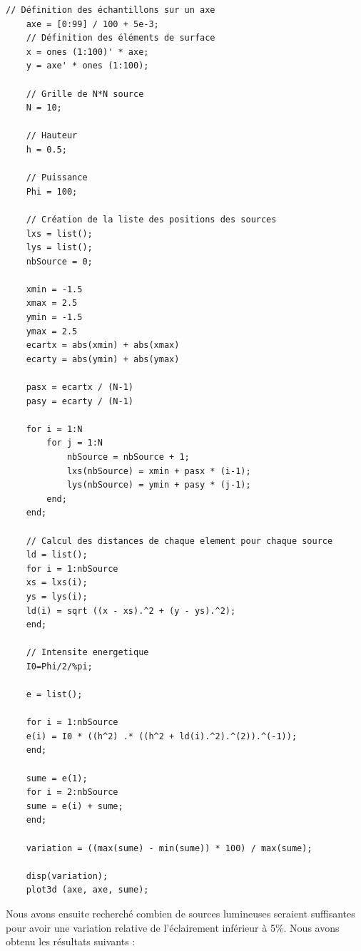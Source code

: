 \documentclass[a4paper,11pt]{article}
\begin{document}
  \begin{lstlisting}[caption=Code pour l'eclairement d'une grille de sources ponctuelles]
    // Définition des échantillons sur un axe
    axe = [0:99] / 100 + 5e-3; 
    // Définition des éléments de surface
    x = ones (1:100)' * axe;
    y = axe' * ones (1:100);

    // Grille de N*N source
    N = 10;

    // Hauteur
    h = 0.5;

    // Puissance
    Phi = 100;

    // Création de la liste des positions des sources
    lxs = list();
    lys = list();
    nbSource = 0;

    xmin = -1.5
    xmax = 2.5
    ymin = -1.5
    ymax = 2.5
    ecartx = abs(xmin) + abs(xmax)
    ecarty = abs(ymin) + abs(ymax)

    pasx = ecartx / (N-1)
    pasy = ecarty / (N-1)

    for i = 1:N
        for j = 1:N
            nbSource = nbSource + 1;
            lxs(nbSource) = xmin + pasx * (i-1);
            lys(nbSource) = ymin + pasy * (j-1);
        end;
    end;

    // Calcul des distances de chaque element pour chaque source
    ld = list();
    for i = 1:nbSource
	xs = lxs(i);
	ys = lys(i);
	ld(i) = sqrt ((x - xs).^2 + (y - ys).^2);
    end;

    // Intensite energetique
    I0=Phi/2/%pi;

    e = list();

    for i = 1:nbSource
	e(i) = I0 * ((h^2) .* ((h^2 + ld(i).^2).^(2)).^(-1));
    end;

    sume = e(1); 
    for i = 2:nbSource
	sume = e(i) + sume;
    end;

    variation = ((max(sume) - min(sume)) * 100) / max(sume);
    
    disp(variation);
    plot3d (axe, axe, sume);
  \end{lstlisting}
  
  \newpage
  
  Nous avons ensuite recherché combien de sources lumineuses seraient suffisantes pour avoir
  une variation relative de l'éclairement inférieur à 5\%. Nous avons obtenu les résultats 
  suivants :
  
\end{document}

